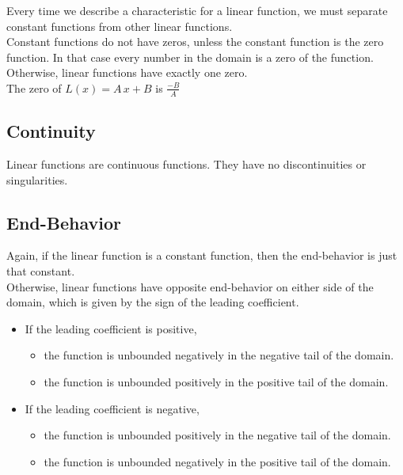 \documentclass{ximera}
\begin{document}
Every time we describe a characteristic for a linear function, we must separate constant functions from other linear functions. \\

Constant functions do not have zeros, unless the constant function is the zero function.  In that case every number in the domain is a zero of the function. \\


Otherwise, linear functions have exactly one zero. \\

The zero of $L(x) = A \, x + B $ is $\frac{-B}{A}$












\subsection*{Continuity}

Linear functions are continuous functions.  They have no discontinuities or singularities. \\






\subsection*{End-Behavior}


Again, if the linear function is a constant function, then the end-behavior is just that constant. \\



Otherwise, linear functions have opposite end-behavior on either side of the domain, which is given by the sign of the leading coefficient. \\


\begin{itemize}
     \item If the leading coefficient is positive,
     \begin{itemize}
          \item the function is unbounded negatively in the negative tail of the domain.
          \item the function is unbounded positively in the positive tail of the domain.
     \end{itemize}
     \item If the leading coefficient is negative,
     \begin{itemize}
          \item the function is unbounded positively in the negative tail of the domain.
          \item the function is unbounded negatively in the positive tail of the domain.
     \end{itemize}
\end{itemize}
\end{document}
